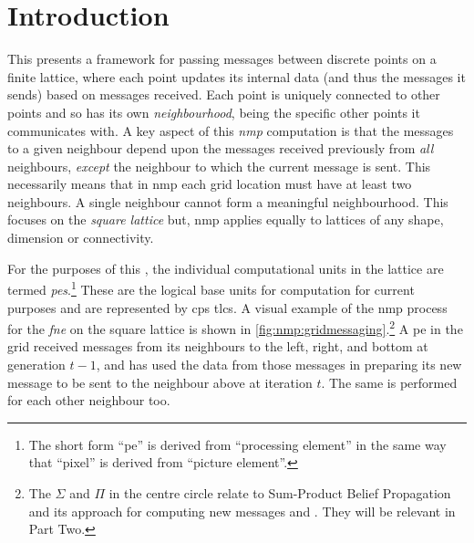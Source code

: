 \section{Introduction}
This  presents a framework for passing messages between discrete points on a finite lattice, where each point updates its internal data (and thus the messages it sends) based on messages received.  Each point is uniquely connected to other points and so has its own \emph{neighbourhood}, being the specific other points it communicates with.  A key aspect of this \emph{\gls{nmp}} computation is that the messages to a given neighbour depend upon the messages received previously from \emph{all} neighbours, \emph{except} the neighbour to which the current message is sent.    This necessarily means that in \gls{nmp} each grid location must have at least two neighbours.  A single neighbour cannot form a meaningful neighbourhood.  This  focuses on the \emph{square lattice} but, \gls{nmp} applies equally to lattices of any shape, dimension or connectivity.

For the purposes of this , the individual computational units in the lattice are termed \emph{\glspl{pe}}.\footnote{The short form ``\gls{pe}'' is derived from ``processing element'' in the same way that ``pixel'' is derived from ``picture element''.}  These are the logical base units for computation for current purposes and are represented by \gls{cps} \glspl{tlc}.  A visual example of the \gls{nmp} process for the \emph{\gls{fne}} on the square lattice is shown in \cref{fig:nmp:gridmessaging}.\footnote{The \(\Sigma\) and \(\Pi\) in the centre circle relate to Sum-Product Belief Propagation and its approach for computing new messages and .  They will be relevant in Part Two.}  A \gls{pe} in the grid received messages from its neighbours to the left, right, and bottom at generation \(t - 1\), and has used the data from those messages in preparing its new message to be sent to the neighbour above at iteration \(t\).  The same is performed for each other neighbour too.

